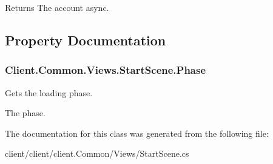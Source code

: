 \begin{DoxyReturn}{Returns}
The account async.
\end{DoxyReturn}


\subsection{Property Documentation}
\hypertarget{classClient_1_1Common_1_1Views_1_1StartScene_abdd3214f601d66c9f235ff70ec097210}{}
\subsubsection[{Phase}]{ Client.\+Common.\+Views.\+Start\+Scene.\+Phase\hspace{0.3cm}{\ttfamily [get]}}\label{classClient_1_1Common_1_1Views_1_1StartScene_abdd3214f601d66c9f235ff70ec097210}


Gets the loading phase. 

The phase.

The documentation for this class was generated from the following file\+:\begin{DoxyCompactItemize}
\item 
client/client/client.\+Common/\+Views/Start\+Scene.\+cs\end{DoxyCompactItemize}
